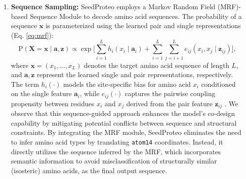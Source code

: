 \documentclass[]{bytedance_seed}
\begin{document}
\begin{enumerate}
    \item \textbf{Sequence Sampling:} SeedProteo employs a Markov Random Field (MRF)-based Sequence Module \cite{renAccurateRobustProtein2024, meynardfast} to decode amino acid sequences. The probability of a sequence $\mathbf{x}$ is parameterized using the learned pair and single representations (Eq. \ref{eq:mrf}):
    \begin{equation}
    \label{eq:mrf}
        \mathrm{P}(\mathbf{X} = \mathbf{x} \mid \mathbf{a}, \mathbf{z}) 
        \propto \exp \bigg[ \sum_{i=1}^{L} h_i(x_i \mid \mathbf{a}_i) + \sum_{i=1}^{L}\sum_{j=i+1}^{L} e_{ij} (x_i, x_j \mid \mathbf{z}_{ij}) \bigg],
    \end{equation} 
    where $\mathbf{x} = (x_1, \dots, x_L)$ denotes the target amino acid sequence of length $L$, and $\mathbf{a}, \mathbf{z}$ represent the learned single and pair representations, respectively. The term $h_i(\cdot)$ models the site-specific bias for amino acid $x_i$ conditioned on the single feature $\mathbf{a}_i$, while $e_{ij}(\cdot)$ captures the pairwise coupling propensity between residues $x_i$ and $x_j$ derived from the pair feature $\mathbf{z}_{ij}$ \cite{balakrishnanLearningGenerativeModels2011}.
    We observe that this sequence-guided approach enhances the model's co-design capability by mitigating potential conflicts between sequence and structural constraints. By integrating the MRF module, SeedProteo eliminates the need to infer amino acid types by translating \texttt{atom14} coordinates. Instead, it directly utilizes the sequence inferred by the MRF, which incorporates semantic information to avoid misclassification of structurally similar (isosteric) amino acids, as the final output sequence.


\end{enumerate}
\end{document}
